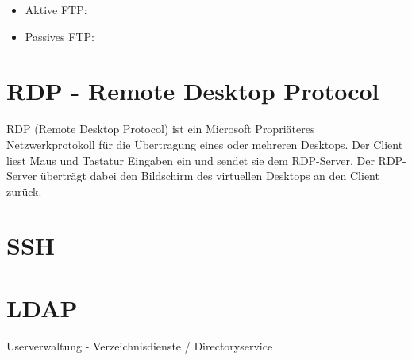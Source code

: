 \documentclass[a4paper]{article}
\begin{document}
\begin{itemize}
\item Aktive FTP: 
\item Passives FTP:
\end{itemize}

\newpage
\section{RDP - Remote Desktop Protocol}

RDP (Remote Desktop Protocol) ist ein Microsoft Propriäteres Netzwerkprotokoll für die Übertragung eines oder mehreren Desktops. Der Client liest Maus und Tastatur Eingaben ein und sendet sie dem RDP-Server. Der RDP-Server überträgt dabei den Bildschirm des virtuellen Desktops an den Client zurück.

\section{SSH}



\section{LDAP}

Userverwaltung - Verzeichnisdienste / Directoryservice
\end{document}

